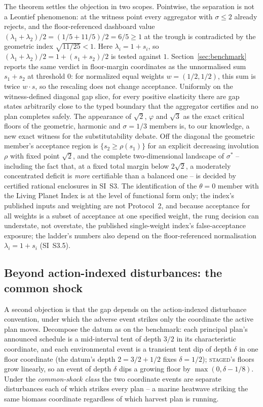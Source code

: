 \documentclass[preprint,11pt,authoryear]{elsarticle}
\theoremstyle{definition}
\theoremstyle{remark}
\newcommand{\act}[1]{\textsc{#1}}
\begin{document}
The theorem settles the objection in two scopes. Pointwise, the separation is not a Leontief phenomenon: at the witness point every aggregator with $\sigma\le2$ already rejects, and the floor-referenced dashboard value $(\lambda_1+\lambda_2)/2=(1/5+11/5)/2=6/5\ge1$ at the trough is contradicted by the geometric index $\sqrt{11/25}<1$. Here $\lambda_i=1+s_i$, so $(\lambda_1+\lambda_2)/2=1+(s_1+s_2)/2$ is tested against $1$. Section~\ref{sec:benchmark} reports the same verdict in floor-margin coordinates as the unnormalised sum $s_1+s_2$ at threshold $0$: for normalized equal weights $w=(1/2,1/2)$, this sum is twice $w\cdot s$, so the rescaling does not change acceptance. Uniformly on the witness-defined diagonal gap slice, for every positive elasticity there are gap states arbitrarily close to the typed boundary that the aggregator certifies and no plan completes safely. The appearance of $\sqrt2$, $\varphi$ and $\sqrt3$ as the exact critical floors of the geometric, harmonic and $\sigma=1/3$ members is, to our knowledge, a new exact witness for the substitutability debate. Off the diagonal the geometric member's acceptance region is $\{s_2\ge\rho(s_1)\}$ for an explicit decreasing involution $\rho$ with fixed point $\sqrt2$, and the complete two-dimensional landscape of $\sigma^*$ -- including the fact that, at a fixed total margin below $2\sqrt2$, a moderately concentrated deficit is \emph{more} certifiable than a balanced one -- is decided by certified rational enclosures in SI~S3. The identification of the $\theta=0$ member with the Living Planet Index is at the level of functional form only; the index's published inputs and weighting are not Protocol~2, and because acceptance for all weights is a subset of acceptance at one specified weight, the rung decision can understate, not overstate, the published single-weight index's false-acceptance exposure; the ladder's numbers also depend on the floor-referenced normalisation $\lambda_i=1+s_i$ (SI~S3.5).

\subsection{Beyond action-indexed disturbances: the common shock}\label{sec:commonshock}

A second objection is that the gap depends on the action-indexed disturbance convention, under which the adverse event strikes only the coordinate the active plan moves. Decompose the datum as on the benchmark: each principal plan's announced schedule is a mid-interval tent of depth $3/2$ in its characteristic coordinate, and each environmental event is a transient tent dip of depth $\delta$ in one floor coordinate (the datum's depth $2=3/2+1/2$ fixes $\delta=1/2$); \act{staged}'s floors grow linearly, so an event of depth $\delta$ dips a growing floor by $\max(0,\delta-1/8)$. Under the \emph{common-shock class} the two coordinate events are separate disturbances each of which strikes every plan -- a marine heatwave striking the same biomass coordinate regardless of which harvest plan is running.
\end{document}
